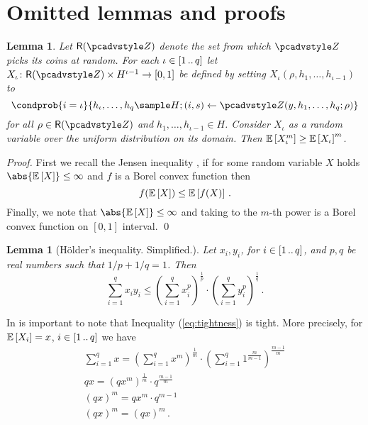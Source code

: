 \let\accentvec\vec \documentclass[runningheads]{llncs}
\newtheorem{lemma}[theorem]{Lemma}
\begin{document}
\section{Omitted lemmas and proofs}
\begin{lemma}\label{lem:jensen}
	Let $\RND{\zdv}$ denote the set from which $\zdv$ picks its coins at random.
	For each $\iota \in [1 \, .. \, q]$ let $X_\iota \colon \RND{\zdv} \times
	H^{\iota - 1} \to [0, 1]$ be defined by setting $X_\iota(\rho, h_1, \ldots,
h_{\iota - 1})$ to 
\[
		\condprob{i = \iota}{h_\iota, \ldots, h_q \sample H; (i, s) \gets \zdv(y, h_1, \ldots, h_q; \rho)} 
	\] 
	for all $\rho \in \RND{\zdv}$ and $h_1, \ldots, h_{\iota - 1} \in H$. Consider $X_\iota$ as a random variable over the uniform distribution on its domain. 
	Then $\mathbb{E}\left[X_\iota^m\right] \geq \mathbb{E}\left[X_\iota\right]^m$.
\end{lemma}
\begin{proof}
	First we recall the Jensen inequality \cite{W:Weissten20}, if for some random variable $X$ holds $\abs{\expected{X}} \leq \infty$ and $f$ is a Borel convex function then 
	\[
		f(\mathbb{E}\left[X\right]) \leq \mathbb{E}\left[f(X)\right]\,.
	\] 
	Finally, we note that $\abs{\expected{X}} \leq \infty$ and taking to the
  $m$-th power is a Borel convex function on $[0, 1]$ interval. \qed
\end{proof}

\begin{lemma}[H\"older's inequality. Simplified.]\label{lem:holder}
	Let $x_i, y_i$, for $i \in [1 \, .. \, q]$, and $p, q$ be real numbers such that
  $1/p + 1/q = 1$. Then
	\[
		\sum_{i = 1}^{q} x_i y_i \leq \left(\sum_{i = 1}^{q} x_i^p\right)^{\frac{1}{p}} \cdot \left(\sum_{i = 1}^{q} y_i^p\right)^{\frac{1}{q}}\,.
	\]
\end{lemma}

\begin{remark}
	In is important to note that Inequality (\ref{eq:tightness}) is tight. More
  precisely, for $\mathbb{E}\left[X_i\right] = x$, $i \in [1 \, .. \, q]$ we have
	\begin{gather*}
		\sum_{i = 1}^q x = \left(\sum_{i = 1}^{q} x^m\right)^\frac{1}{m} \cdot \left(\sum_{i = 1}^{q} 1^{\frac{m}{m - 1}}\right)^{\frac{m - 1}{m}} \\
		qx = \left(qx^m\right)^\frac{1}{m} \cdot q^{\frac{m - 1}{m}} \\
		(qx)^m = qx^m \cdot q^{m - 1} \\
		(qx)^m = (qx)^m\,.
	\end{gather*}
\end{remark}
\end{document}
